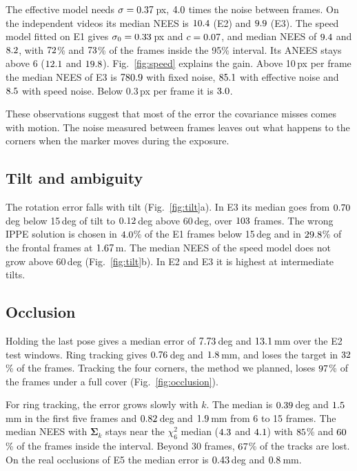 \documentclass[conference]{IEEEtran}
\begin{document}
The effective model needs $\sigma = 0.37$\,px, $4.0$ times the noise between frames.
On the independent videos its median NEES is $10.4$ (E2) and $9.9$
(E3). The speed model fitted on E1 gives $\sigma_0 = 0.33$\,px and $c = 0.07$, and median NEES
of $9.4$ and $8.2$, with $72$\% and $73$\% of the
frames inside the 95\% interval. Its ANEES stays above 6 ($12.1$ and $19.8$).
Fig.~\ref{fig:speed} explains the gain. Above 10\,px per frame the median NEES of E3 is
$780.9$ with fixed noise, $85.1$ with effective noise and
$8.5$ with speed noise. Below 0.3\,px per frame it is $3.0$.

These observations suggest that most of the error the covariance misses comes with motion. The noise
measured between frames leaves out what happens to the corners when the marker moves during the exposure.

\subsection{Tilt and ambiguity}
The rotation error falls with tilt (Fig.~\ref{fig:tilt}a). In E3 its median goes from $0.70$\,deg
below 15\,deg of tilt to $0.12$\,deg above 60\,deg, over $103$ frames. The wrong
IPPE solution is chosen in $4.0$\% of the E1 frames below 15\,deg and in $29.8$\% of
the frontal frames at $1.67$\,m. The median NEES of the speed model does not grow above 60\,deg
(Fig.~\ref{fig:tilt}b). In E2 and E3 it is highest at intermediate tilts.

\subsection{Occlusion}
Holding the last pose gives a median error of $7.73$\,deg and $13.1$\,mm over
the E2 test windows. Ring tracking gives $0.76$\,deg and $1.8$\,mm, and loses
the target in $32$\% of the frames. Tracking the four corners, the method we planned, loses
$97$\% of the frames under a full cover (Fig.~\ref{fig:occlusion}).

For ring tracking, the error grows slowly with $k$. The median is $0.39$\,deg and
$1.5$\,mm in the first five frames and $0.82$\,deg and $1.9$\,mm
from 6 to 15 frames. The median NEES with $\boldsymbol{\Sigma}_k$ stays near the $\chi^2_6$ median
($4.3$ and $4.1$) with $85$\% and $60$\% of
the frames inside the interval. Beyond 30 frames, $67$\% of the tracks are lost. On the
real occlusions of E5 the median error is $0.43$\,deg and $0.8$\,mm.
\end{document}
